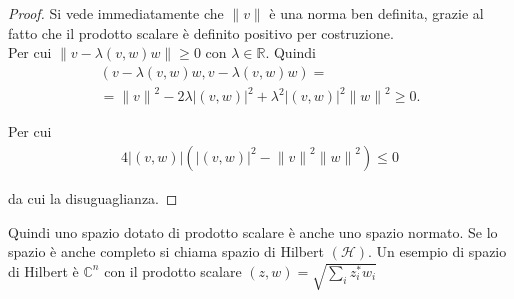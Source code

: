 \documentclass[italian,twoside,headinclude,10pt]{scrbook}
\theoremstyle{definition}
\newcommand{\abs}[1]{{\left|#1\right|}}
\newcommand{\norm}[1]{{\|#1\|}}
\begin{document}
\begin{proof}
Si vede immediatamente che $\norm{v}$ è una norma ben definita, grazie al fatto che il prodotto scalare è definito positivo per costruzione. \\
Per cui $\norm{v - \lambda(v,w)w} \geq 0$ con $\lambda \in \mathbb{R}$. 
Quindi
\begin{gather*}
(v - \lambda(v,w)w,v - \lambda(v,w)w) = \\
=\norm{v}^2 - 2\lambda\abs{(v,w)}^2 +\lambda^2 \abs{(v,w)}^2 \norm{w}^2 \geq 0 .
\end{gather*}

Per cui
\begin{align*}
4\abs{(v,w)}\left(\abs{(v,w)}^2 - \norm{v}^2 \norm{w}^2\right) \leq 0
\end{align*}

da cui la disuguaglianza.
\end{proof}

Quindi uno spazio dotato di prodotto scalare è anche uno spazio normato. Se lo spazio è anche completo si chiama spazio di Hilbert $\left(\mathcal{H}\right)$. Un esempio di spazio di Hilbert è $\mathbb{C}^n$ con il prodotto scalare $(z,w) = \sqrt{\sum_i z_i^\ast w_i}$

\end{document}
